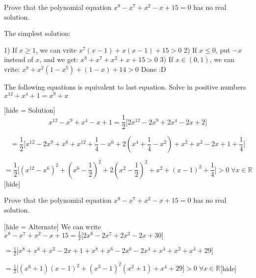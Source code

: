 \begin{solution}
	\begin{tcolorbox}Prove that the polynomial equation $x^{8}-x^{7}+x^{2}-x+15=0$ has no real solution.\end{tcolorbox}

\begin{bolded}The simplest solution:\end{bolded}
1) If $x\geq1$, we can vrite $x^7(x-1)+x(x-1)+15>0$
2) If $x\leq0$, put $-x$ instead of $x$, and we get: $x^8+x^7+x^2+x+15>0$
3) If $x\in(0,1)$, we can vrite: $x^8+x^2(1-x^5)+(1-x)+14>0$
Done  :D 

\end{solution}



\begin{solution}
	\begin{tcolorbox}The following equations is equivalent to last equation.
Solve in positive numbers $x^{12}+x^4+1=x^9+x$\end{tcolorbox}

[hide = Solution]$$x^{12}-x^9+x^4-x+1 = \frac{1}{2}\bigg[2x^{12}-2x^9+2x^4-2x+2\bigg]$$

$$ = \frac{1}{2}\bigg[x^{12}-2x^9+x^6+x^{12}+\frac{1}{4}-x^6+2\left(x^4+\frac{1}{4}-x^2\right)+x^2+x^2-2x+1+\frac{1}{4}\bigg]$$

$$ = \frac{1}{2}\bigg[\left(x^{12}-x^6\right)^2+\left(x^6-\frac{1}{2}\right)^2+2\left(x^2-\frac{1}{2}\right)^2+x^2+(x-1)^2+\frac{1}{4}\bigg]>0\;\forall x \in \mathbb{R}$$[\/hide]
\end{solution}



\begin{solution}
	\begin{tcolorbox}Prove that the polynomial equation $x^{8}-x^{7}+x^{2}-x+15=0$ has no real solution.\end{tcolorbox}

[hide = Alternate] We can write $x^8-x^7+x^2-x+15 = \frac{1}{2}\bigg[2x^8-2x^7+2x^2-2x+30\bigg]$

$ = \frac{1}{2}\bigg[x^8+x^6+x^2-2x+1+x^8+x^6-2x^6-2x^4+x^4+x^2+x^4+29\bigg]$

$ = \frac{1}{2}\bigg[(x^6+1)(x-1)^2+(x^3-1)^2(x^2+1)+x^4+29\bigg]>0\;\forall x \in \mathbb{R}$[\/hide]
\end{solution}



